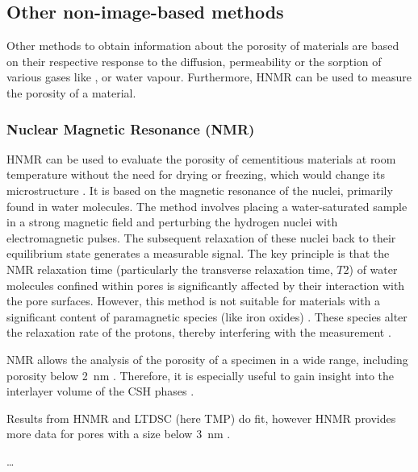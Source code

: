 \subsection{Other non-image-based methods}
\label{subsec:other_porosity}

Other methods to obtain information about the porosity of materials are based on their respective response to the diffusion, permeability or the sorption of various gases like ,  or water vapour.
Furthermore, \ac{HNMR} can be used to measure the porosity of a material.

\subsubsection{ Nuclear Magnetic Resonance (\acs{NMR})}

\ac{HNMR} can be used to evaluate the porosity of cementitious materials at room temperature without the need for drying or freezing, which would change its microstructure \cite{gran.1997,muller.2014,naber.2020}.
It is based on the magnetic resonance of the  nuclei, primarily found in water molecules.
The method involves placing a water-saturated sample in a strong magnetic field and perturbing the hydrogen nuclei with electromagnetic pulses.
The subsequent relaxation of these nuclei back to their equilibrium state generates a measurable signal.
The key principle is that the \ac{NMR} relaxation time (particularly the transverse relaxation time, $T2$) of water molecules confined within pores is significantly affected by their interaction with the pore surfaces. %
However, this method is not suitable for materials with a significant content of paramagnetic species (like iron oxides) \cite{barrie.2000}. 
These species alter the relaxation rate of the protons, thereby interfering with the measurement \cite{muller.2014}.

\ac{NMR} allows the analysis of the porosity of a specimen in a wide range, including porosity below \qty{2}{\nano\meter} \cite{barrie.2000}. 
Therefore, it is especially useful to gain insight into the interlayer volume of the \ac{CSH} phases \cite{naber.2020}.

{\color{red}
Results from \ac{HNMR} and \ac{LTDSC} (here TMP) do fit, however \ac{HNMR} provides more data for pores with a size below \qty{3}{\nano\meter} \cite{joseph.2024}.

\dots
}


